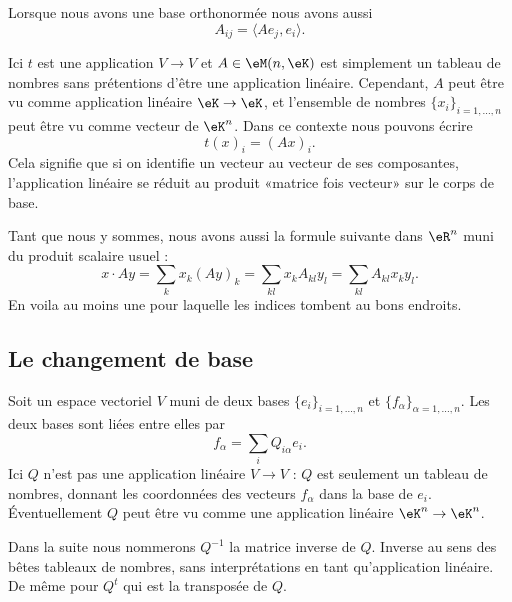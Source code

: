 Lorsque nous avons une base orthonormée nous avons aussi
\begin{equation}        \label{EQooDSKBooQkgtWv}
    A_{ij}=\langle Ae_j, e_i\rangle .
\end{equation}

Ici \( t\) est une application \( V\to V\) et \( A\in \eM(n,\eK)\) est simplement un tableau de nombres sans prétentions d'être une application linéaire. Cependant, \( A\) peut être vu comme application linéaire \( \eK\to \eK\), et l'ensemble de nombres \( \{ x_i \}_{i=1,\ldots, n}\) peut être vu comme vecteur de \( \eK^n\). Dans ce contexte nous pouvons écrire
\begin{equation}
    t(x)_i=(Ax)_i.
\end{equation}
Cela signifie que si on identifie un vecteur au vecteur de ses composantes, l'application linéaire se réduit au produit «matrice fois vecteur» sur le corps de base.

Tant que nous y sommes, nous avons aussi la formule suivante dans \( \eR^n\) muni du produit scalaire usuel :
\begin{equation}        \label{EQooFYNYooFQhVyE}
    x\cdot Ay=\sum_kx_k(Ay)_k=\sum_{kl}x_kA_{kl}y_l=\sum_{kl}A_{kl}x_ky_l.
\end{equation}
En voila au moins une pour laquelle les indices tombent au bons endroits.

\subsection{Le changement de base}

Soit un espace vectoriel \( V\) muni de deux bases \( \{ e_i\}_{i=1,\ldots, n}\) et \( \{ f_{\alpha}\}_{\alpha=1,\ldots, n}\). Les deux bases sont liées entre elles par
\begin{equation}        \label{EQooFRQRooSMsQQB}
    f_{\alpha}=\sum_iQ_{i\alpha}e_i.
\end{equation}
Ici \( Q\) n'est pas une application linéaire \( V\to V\) : \( Q\) est seulement un tableau de nombres, donnant les coordonnées des vecteurs \( f_{\alpha}\) dans la base de \( e_i\). Éventuellement \( Q\) peut être vu comme une application linéaire \( \eK^n\to \eK^n\).

Dans la suite nous nommerons \( Q^{-1}\) la matrice inverse de \( Q\). Inverse au sens des bêtes tableaux de nombres, sans interprétations en tant qu'application linéaire. De même pour \( Q^t\) qui est la transposée de \( Q\).

